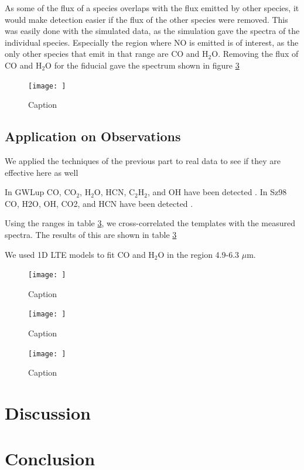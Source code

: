 \documentclass[twoside, single, authoryear, semicolon]{lion-msc}
\newcommand{\4}{$_4$}
\newcommand{\3}{$_3$}
\newcommand{\2}{$_2$}
\begin{document}


As some of the flux of a species overlaps with the flux emitted by other species, it would make detection easier if the flux of the other species were removed. This was easily done with the simulated data, as the simulation gave the spectra of the individual species. Especially the region where NO is emitted is of interest, as the only other species that emit in that range are CO and H\2O. Removing the flux of CO and H\2O for the fiducial gave the spectrum shown in figure \ref{}

\begin{figure}
    \centering
    \texttt{[image: ]}
    \caption{Caption}
    \label{fig:enter-label}
\end{figure}

\section{Application on Observations}
We applied the techniques of the previous part to real data to see if they are effective here as well

In GWLup CO, CO\2, H\2O, HCN, C\2H\2, and OH have been detected \citep{Grant_2023}. In Sz98 CO, H2O, OH, CO2, and HCN have been detected \citep{Gasman_2023}. 

Using the ranges in table \ref{}, we cross-correlated the templates with the measured spectra. The results of this are shown in table \ref{}

We used 1D LTE models to fit CO and H\2O in the region 4.9-6.3 $\mu$m.
\begin{figure}
    \centering
    \texttt{[image: ]}
    \caption{Caption}
    \label{fig:enter-label}
\end{figure}
\begin{figure}
    \centering
    \texttt{[image: ]}
    \caption{Caption}
    \label{fig:enter-label}
\end{figure}
\begin{figure}
    \centering
    \texttt{[image: ]}
    \caption{Caption}
    \label{fig:enter-label}
\end{figure}



\chapter{Discussion}


\chapter{Conclusion}



\end{document}
